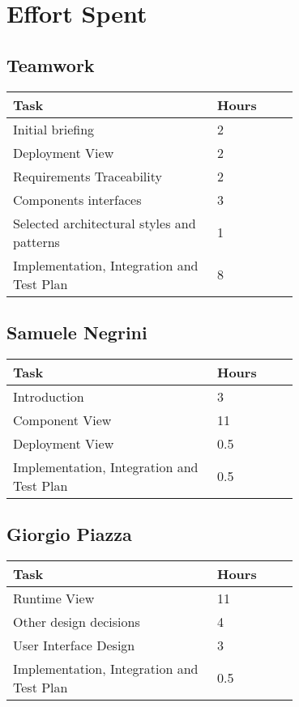 \chapter{Effort Spent}

\section{Teamwork}
\vspace{2mm}
\begin{center}
    \begin{tabular}{@{}p{0.5\linewidth} p{0.2\linewidth}@{}}
        \hline
        \textbf{Task} & \textbf{Hours} \\ \hline
        Initial briefing & 2 \\ \hline
        Deployment View & 2 \\ \hline
        Requirements Traceability & 2\\ \hline
        Components interfaces & 3\\ \hline
        Selected architectural styles and patterns & 1\\ \hline
        Implementation, Integration and Test Plan & 8\\ \hline
    \end{tabular}
\end{center}

\section{Samuele Negrini}
\vspace{2mm}
\begin{center}
	\begin{tabular}{@{}p{0.5\linewidth} p{0.2\linewidth}@{}}
		\hline
		\textbf{Task} & \textbf{Hours} \\ \hline
		Introduction & 3 \\ \hline
		Component View & 11 \\ \hline
		Deployment View & 0.5 \\ \hline
		Implementation, Integration and Test Plan & 0.5\\ \hline
	\end{tabular}
\end{center}

\section{Giorgio Piazza}
\vspace{2mm}
\begin{center}
	\begin{tabular}{@{}p{0.5\linewidth} p{0.2\linewidth}@{}}
		\hline
		\textbf{Task} & \textbf{Hours} \\ \hline
		Runtime View & 11 \\ \hline
		Other design decisions & 4 \\ \hline
		User Interface Design & 3 \\ \hline
		Implementation, Integration and Test Plan & 0.5\\ \hline
	\end{tabular}
\end{center}